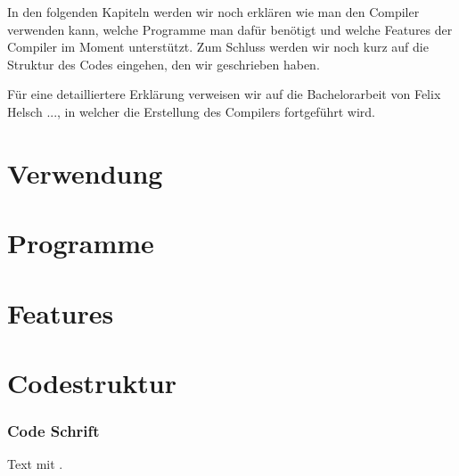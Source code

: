 

In den folgenden Kapiteln werden wir noch erklären wie man den Compiler verwenden kann, welche Programme man dafür benötigt und welche Features der Compiler im Moment unterstützt. Zum Schluss werden wir noch kurz auf die Struktur des Codes eingehen, den wir geschrieben haben.

Für eine detailliertere Erklärung verweisen wir auf die Bachelorarbeit von Felix Helsch ..., in welcher die Erstellung des Compilers fortgeführt wird.


\section{Verwendung}



\section{Programme}



\section{Features}



\section{Codestruktur}






\appendix
\newpage
%

\clearpage
\listoffigures
\clearpage
\listoftables
\clearpage
\lstlistoflistings
\clearpage
\nocite{*}
\printbibliography



\subsubsection*{Code Schrift}
Text mit   .

